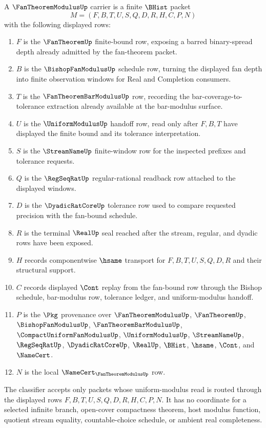 \begin{definition}
\label{def:fan-theorem-modulus-carrier}
A $\FanTheoremModulusUp$ carrier is a finite $\BHist$ packet
$$
M=(F,B,T,U,S,Q,D,R,H,C,P,N)
$$
with the following displayed rows:
\begin{enumerate}
\item $F$ is the $\FanTheoremUp$ finite-bound row, exposing a barred binary-spread depth already admitted by the fan-theorem packet.
\item $B$ is the $\BishopFanModulusUp$ schedule row, turning the displayed fan depth into finite observation windows for Real and Completion consumers.
\item $T$ is the $\FanTheoremBarModulusUp$ row, recording the bar-coverage-to-tolerance extraction already available at the bar-modulus surface.
\item $U$ is the $\UniformModulusUp$ handoff row, read only after $F,B,T$ have displayed the finite bound and its tolerance interpretation.
\item $S$ is the $\StreamNameUp$ finite-window row for the inspected prefixes and tolerance requests.
\item $Q$ is the $\RegSeqRatUp$ regular-rational readback row attached to the displayed windows.
\item $D$ is the $\DyadicRatCoreUp$ tolerance row used to compare requested precision with the fan-bound schedule.
\item $R$ is the terminal $\RealUp$ seal reached after the stream, regular, and dyadic rows have been exposed.
\item $H$ records componentwise $\hsame$ transport for $F,B,T,U,S,Q,D,R$ and their structural support.
\item $C$ records displayed $\Cont$ replay from the fan-bound row through the Bishop schedule, bar-modulus row, tolerance ledger, and uniform-modulus handoff.
\item $P$ is the $\Pkg$ provenance over $\FanTheoremModulusUp$, $\FanTheoremUp$, $\BishopFanModulusUp$, $\FanTheoremBarModulusUp$, $\CompactUniformFanModulusUp$, $\UniformModulusUp$, $\StreamNameUp$, $\RegSeqRatUp$, $\DyadicRatCoreUp$, $\RealUp$, $\BHist$, $\hsame$, $\Cont$, and $\NameCert$.
\item $N$ is the local $\NameCert_{\FanTheoremModulusUp}$ row.
\end{enumerate}
The classifier accepts only packets whose uniform-modulus read is routed through the displayed rows $F,B,T,U,S,Q,D,R,H,C,P,N$. It has no coordinate for a selected infinite branch, open-cover compactness theorem, host modulus function, quotient stream equality, countable-choice schedule, or ambient real completeness.
\end{definition}

